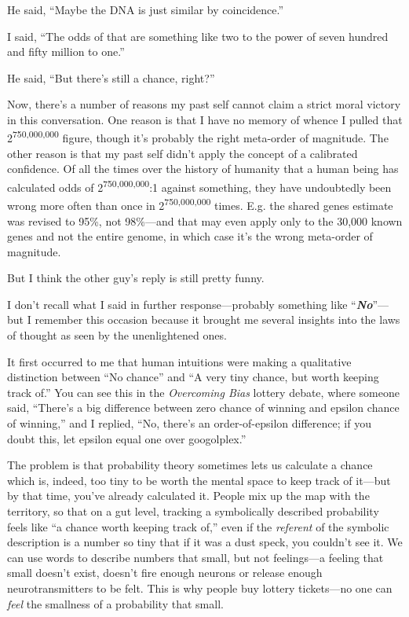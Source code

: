 {
 He said, ``Maybe the DNA is just similar by
coincidence.''}

{
 I said, ``The odds of that are something like two
to the power of seven hundred and fifty million to
one.''}

{
 He said, ``But there's still a
chance, right?''}

{
 Now, there's a number of reasons my past self
cannot claim a strict moral victory in this conversation. One reason is
that I have no memory of whence I pulled that
2\textsuperscript{750,000,000} figure, though it's
probably the right meta-order of magnitude. The other reason is that my
past self didn't apply the concept of a calibrated
confidence. Of all the times over the history of humanity that a human
being has calculated odds of 2\textsuperscript{750,000,000}:1 against
something, they have undoubtedly been wrong more often than once in
2\textsuperscript{750,000,000} times. E.g. the shared genes estimate
was revised to 95\%, not 98\%---and that may even apply only to the
30,000 known genes and not the entire genome, in which case
it's the wrong meta-order of magnitude.}

{
 But I think the other guy's reply is still pretty
funny.}

{
 I don't recall what I said in further
response---probably something like
``\textbf{\textit{No}}''---but I
remember this occasion because it brought me several insights into the
laws of thought as seen by the unenlightened ones.}

{
 It first occurred to me that human intuitions were making a
qualitative distinction between ``No
chance'' and ``A very tiny chance,
but worth keeping track of.'' You can see this in the
\textit{Overcoming Bias} lottery debate, where someone said,
``There's a big difference between
zero chance of winning and epsilon chance of
winning,'' and I replied, ``No,
there's an order-of-epsilon difference; if you doubt
this, let epsilon equal one over googolplex.''}

{
 The problem is that probability theory sometimes lets us calculate
a chance which is, indeed, too tiny to be worth the mental space to
keep track of it---but by that time, you've already
calculated it. People mix up the map with the territory, so that on a
gut level, tracking a symbolically described probability feels like
``a chance worth keeping track of,''
even if the \textit{referent} of the symbolic description is a number
so tiny that if it was a dust speck, you couldn't see
it. We can use words to describe numbers that small, but not
feelings---a feeling that small doesn't exist,
doesn't fire enough neurons or release enough
neurotransmitters to be felt. This is why people buy lottery
tickets---no one can \textit{feel} the smallness of a probability that
small.}

